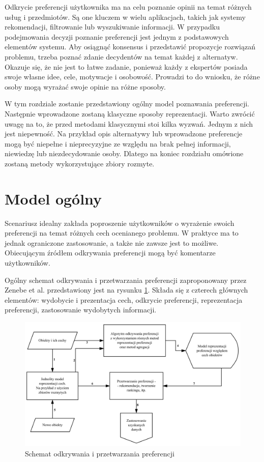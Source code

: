 Odkrycie preferencji użytkownika ma na celu poznanie opinii na temat różnych 
usług i przedmiotów. Są one kluczem w wielu aplikacjach, takich jak systemy 
rekomendacji, filtrowanie lub wyszukiwanie informacji. W przypadku podejmowania 
decyzji poznanie preferencji jest jednym z podstawowych elementów systemu. Aby 
osiągnąć konsensus i przedstawić propozycje rozwiązań problemu, trzeba poznać 
zdanie decydentów na temat każdej z alternatyw. Okazuje się, że nie jest to 
łatwe zadanie, ponieważ każdy z ekspertów posiada swoje własne idee, cele, 
motywacje i osobowość. Prowadzi to do wniosku, że różne osoby mogą wyrażać 
swoje opinie na różne sposoby.

W tym rozdziale zostanie przedstawiony ogólny model poznawania preferencji. 
Następnie wprowadzone zostaną klasyczne sposoby reprezentacji. Warto zwrócić 
uwagę na to, że przed metodami klasycznymi stoi kilka wyzwań. Jednym z nich 
jest niepewność. Na przykład opis alternatywy lub wprowadzone preferencje mogą 
być niepełne i nieprecyzyjne ze względu na brak pełnej informacji, niewiedzę 
lub niezdecydowanie osoby. Dlatego na koniec rozdziału omówione zostaną metody 
wykorzystujące zbiory rozmyte.


\section{Model ogólny}
Scenariusz idealny zakłada poproszenie użytkowników o wyrażenie swoich 
preferencji na temat różnych cech ocenianego problemu. W praktyce ma to jednak 
ograniczone zastosowanie, a także nie zawsze jest to możliwe. Obiecującym 
źródłem odkrywania preferencji mogą być komentarze użytkowników.

Ogólny schemat odkrywania i przetwarzania preferencji zaproponowany przez
Zenebe et al. \cite{Zenebe2010} przedstawiony jest na rysunku
\ref{fig:ogolny_model_preferencji}. Składa się z czterech głównych
elementów: wydobycie i prezentacja cech, odkrycie preferencji, reprezentacja
preferencji, zastosowanie wydobytych informacji.

\begin{figure}[ht]
  \includegraphics[width=\linewidth]
  	{chapters/preferences/ogolny_model_preferencji}
  \caption{Schemat odkrywania i przetwarzania preferencji}
  \label{fig:ogolny_model_preferencji}
\end{figure}

